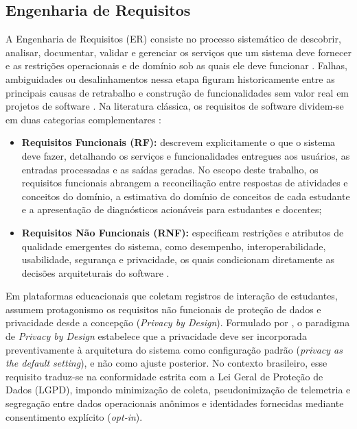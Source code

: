 \subsection{Engenharia de Requisitos}
\label{subsec:engenharia-requisitos}

A Engenharia de Requisitos (ER) consiste no processo sistemático de descobrir, analisar, documentar, validar e gerenciar os serviços que um sistema deve fornecer e as restrições operacionais e de domínio sob as quais ele deve funcionar \cite{sommerville_engenharia_2019, wiegers_software_2013}. Falhas, ambiguidades ou desalinhamentos nessa etapa figuram historicamente entre as principais causas de retrabalho e construção de funcionalidades sem valor real em projetos de software \cite{vazquez_engenharia_2016}. Na literatura clássica, os requisitos de software dividem-se em duas categorias complementares \cite{sommerville_engenharia_2019, pressman_engenharia_2021}:

\begin{itemize}
    \item \textbf{Requisitos Funcionais (RF):} descrevem explicitamente o que o sistema deve fazer, detalhando os serviços e funcionalidades entregues aos usuários, as entradas processadas e as saídas geradas. No escopo deste trabalho, os requisitos funcionais abrangem a reconciliação entre respostas de atividades e conceitos do domínio, a estimativa do domínio de conceitos de cada estudante e a apresentação de diagnósticos acionáveis para estudantes e docentes;
    \item \textbf{Requisitos Não Funcionais (RNF):} especificam restrições e atributos de qualidade emergentes do sistema, como desempenho, interoperabilidade, usabilidade, segurança e privacidade, os quais condicionam diretamente as decisões arquiteturais do software \cite{bass_software_2021}.
\end{itemize}

Em plataformas educacionais que coletam registros de interação de estudantes, assumem protagonismo os requisitos não funcionais de proteção de dados e privacidade desde a concepção (\textit{Privacy by Design}). Formulado por , o paradigma de \textit{Privacy by Design} estabelece que a privacidade deve ser incorporada preventivamente à arquitetura do sistema como configuração padrão (\textit{privacy as the default setting}), e não como ajuste posterior. No contexto brasileiro, esse requisito traduz-se na conformidade estrita com a Lei Geral de Proteção de Dados (LGPD), impondo minimização de coleta, pseudonimização de telemetria e segregação entre dados operacionais anônimos e identidades fornecidas mediante consentimento explícito (\textit{opt-in}).

